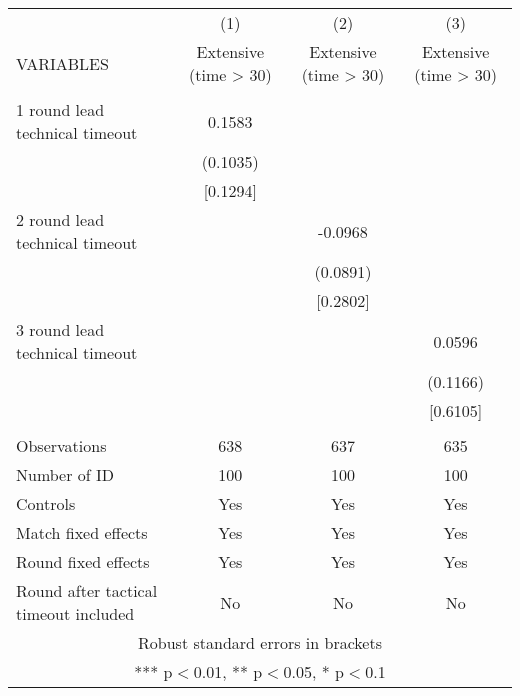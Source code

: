 \documentclass[]{article}
\begin{document}
\begin{tabular}{lccc} \hline
 & (1) & (2) & (3) \\
VARIABLES & Extensive (time > 30) & Extensive (time > 30) & Extensive (time > 30) \\ \hline
 &  &  &  \\
1 round lead technical timeout & 0.1583 &  &  \\
 & (0.1035) &  &  \\
 & [0.1294] &  &  \\
2 round lead technical timeout &  & -0.0968 &  \\
 &  & (0.0891) &  \\
 &  & [0.2802] &  \\
3 round lead technical timeout &  &  & 0.0596 \\
 &  &  & (0.1166) \\
 &  &  & [0.6105] \\
 &  &  &  \\
Observations & 638 & 637 & 635 \\
Number of ID & 100 & 100 & 100 \\
Controls & Yes & Yes & Yes \\
Match fixed effects & Yes & Yes & Yes \\
Round fixed effects & Yes & Yes & Yes \\
 Round after tactical timeout included & No & No & No \\ \hline
\multicolumn{4}{c}{ Robust standard errors in brackets} \\
\multicolumn{4}{c}{ *** p$<$0.01, ** p$<$0.05, * p$<$0.1} \\
\end{tabular}
\end{document}
